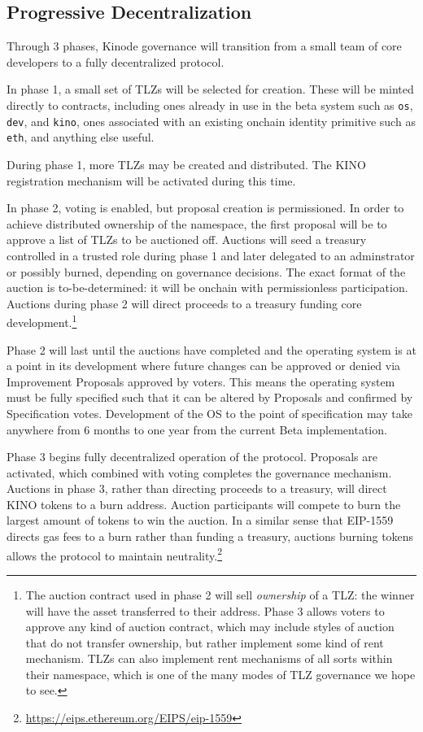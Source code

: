 \documentclass[runningheads]{llncs}
\begin{document}
\subsection{Progressive Decentralization}
\label{sec:decentralization}

Through 3 phases, Kinode governance will transition from a small team of core developers to a fully decentralized protocol.

In phase 1, a small set of TLZs will be selected for creation. These will be minted directly to contracts, including ones already in use in the beta system such as \verb|os|, \verb|dev|, and \verb|kino|, ones associated with an existing onchain identity primitive such as \verb|eth|, and anything else useful.

During phase 1, more TLZs may be created and distributed.
The KINO registration mechanism will be activated during this time.

In phase 2, voting is enabled, but proposal creation is permissioned.
In order to achieve distributed ownership of the namespace, the first proposal will be to approve a list of TLZs to be auctioned off.
Auctions will seed a treasury controlled in a trusted role during phase 1 and later delegated to an adminstrator or possibly burned, depending on governance decisions.
The exact format of the auction is to-be-determined: it will be onchain with permissionless participation.
Auctions during phase 2 will direct proceeds to a treasury funding core development.\footnote{The auction contract used in phase 2 will sell \textit{ownership} of a TLZ: the winner will have the asset transferred to their address.
Phase 3 allows voters to approve any kind of auction contract, which may include styles of auction that do not transfer ownership, but rather implement some kind of rent mechanism.
TLZs can also implement rent mechanisms of all sorts within their namespace, which is one of the many modes of TLZ governance we hope to see.}

Phase 2 will last until the auctions have completed and the operating system is at a point in its development where future changes can be approved or denied via Improvement Proposals approved by voters.
This means the operating system must be fully specified such that it can be altered by Proposals and confirmed by Specification votes.
Development of the OS to the point of specification may take anywhere from 6 months to one year from the current Beta implementation.

Phase 3 begins fully decentralized operation of the protocol.
Proposals are activated, which combined with voting completes the governance mechanism.
Auctions in phase 3, rather than directing proceeds to a treasury, will direct KINO tokens to a burn address.
Auction participants will compete to burn the largest amount of tokens to win the auction.
In a similar sense that EIP-1559 directs gas fees to a burn rather than funding a treasury, auctions burning tokens allows the protocol to maintain neutrality.\footnote{\url{https://eips.ethereum.org/EIPS/eip-1559}}
\end{document}

